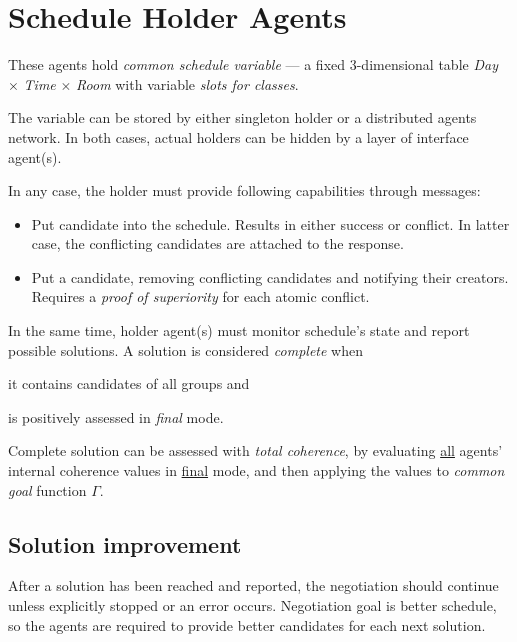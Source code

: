 \documentclass[../../ThesisDoc]{subfiles}
\begin{document}
\providecommand{\rootdir}{../..}


\section{Schedule Holder Agents}
\label{sec:solution-schedule-var}

These agents hold \emph{common schedule variable} --- a fixed 3-dimensional table
\emph{Day} $\times$ \emph{Time} $\times$ \emph{Room} with variable
\emph{slots for classes}.

The variable can be stored by either singleton holder or a distributed agents network.
In both cases, actual holders can be hidden by a layer of interface agent(s).

In any case, the holder must provide following capabilities through messages:
\begin{itemize}
  \item Put candidate into the schedule. Results in either success or conflict.
        In latter case, the conflicting candidates are attached to the response.
  \item Put a candidate, removing conflicting candidates and notifying their
        creators. Requires a \emph{proof of superiority} for each atomic conflict.
\end{itemize}

\medskip
\noindent
In the same time, holder agent(s) must monitor schedule's state and report
possible solutions. A solution is considered \emph{complete} when
\begin{enumerate*}[1)]
  \item it contains candidates of all groups and
  \item is positively assessed in \emph{final} mode.
\end{enumerate*}

Complete solution can be assessed with \emph{total coherence}, by
evaluating \underline{all} agents' internal coherence values in \underline{final}
mode, and then applying the values to \emph{common goal} function $\Gamma$.

\subsection{Solution improvement}
\label{sec:solution-better}

After a solution has been reached and reported, the negotiation should continue
unless explicitly stopped or an error occurs. Negotiation goal is better
schedule, so the agents are required to provide better candidates for each next
solution.
\end{document}
